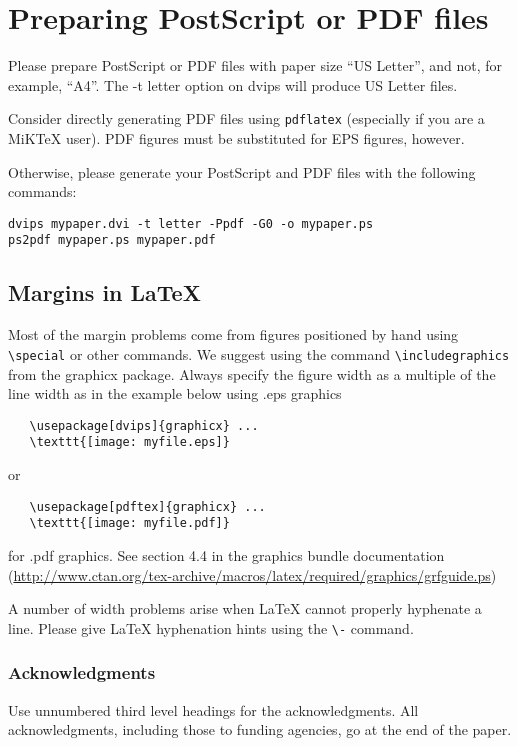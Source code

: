 \documentclass{article} %
\begin{document}
\section{Preparing PostScript or PDF files}

Please prepare PostScript or PDF files with paper size ``US Letter'', and
not, for example, ``A4''. The -t
letter option on dvips will produce US Letter files.

Consider directly generating PDF files using \verb+pdflatex+
(especially if you are a MiKTeX user).
PDF figures must be substituted for EPS figures, however.

Otherwise, please generate your PostScript and PDF files with the following commands:
\begin{verbatim}
dvips mypaper.dvi -t letter -Ppdf -G0 -o mypaper.ps
ps2pdf mypaper.ps mypaper.pdf
\end{verbatim}

\subsection{Margins in LaTeX}

Most of the margin problems come from figures positioned by hand using
\verb+\special+ or other commands. We suggest using the command
\verb+\includegraphics+
from the graphicx package. Always specify the figure width as a multiple of
the line width as in the example below using .eps graphics
\begin{verbatim}
   \usepackage[dvips]{graphicx} ...
   \texttt{[image: myfile.eps]}
\end{verbatim}
or %
\begin{verbatim}
   \usepackage[pdftex]{graphicx} ...
   \texttt{[image: myfile.pdf]}
\end{verbatim}
for .pdf graphics.
See section 4.4 in the graphics bundle documentation (\url{http://www.ctan.org/tex-archive/macros/latex/required/graphics/grfguide.ps})

A number of width problems arise when LaTeX cannot properly hyphenate a
line. Please give LaTeX hyphenation hints using the \verb+\-+ command.


\subsubsection*{Acknowledgments}

Use unnumbered third level headings for the acknowledgments. All
acknowledgments, including those to funding agencies, go at the end of the paper.



\end{document}
